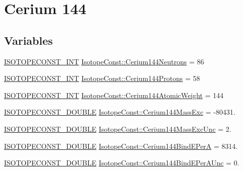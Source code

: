 \hypertarget{group___isotope_const-_cerium-_ce144}{}\section{Cerium 144}
\label{group___isotope_const-_cerium-_ce144}
\subsection*{Variables}
\begin{DoxyCompactItemize}
\item 
\mbox{\hyperlink{group___isotope_const-_macros_ga5f18360b3e99483a35c32d789e62621c}{I\+S\+O\+T\+O\+P\+E\+C\+O\+N\+S\+T\+\_\+\+I\+NT}} \mbox{\hyperlink{group___isotope_const-_cerium-_ce144_ga39587347aeadc54212b3129c64278e13}{Isotope\+Const\+::\+Cerium144\+Neutrons}} = 86
\item 
\mbox{\hyperlink{group___isotope_const-_macros_ga5f18360b3e99483a35c32d789e62621c}{I\+S\+O\+T\+O\+P\+E\+C\+O\+N\+S\+T\+\_\+\+I\+NT}} \mbox{\hyperlink{group___isotope_const-_cerium-_ce144_gac6527e4cbb32809e03fd189a5342e908}{Isotope\+Const\+::\+Cerium144\+Protons}} = 58
\item 
\mbox{\hyperlink{group___isotope_const-_macros_ga5f18360b3e99483a35c32d789e62621c}{I\+S\+O\+T\+O\+P\+E\+C\+O\+N\+S\+T\+\_\+\+I\+NT}} \mbox{\hyperlink{group___isotope_const-_cerium-_ce144_ga6a5dea2a40fff5707820eead37204176}{Isotope\+Const\+::\+Cerium144\+Atomic\+Weight}} = 144
\item 
\mbox{\hyperlink{group___isotope_const-_macros_ga8f45a7272ce02c0b4c65c44636ed719a}{I\+S\+O\+T\+O\+P\+E\+C\+O\+N\+S\+T\+\_\+\+D\+O\+U\+B\+LE}} \mbox{\hyperlink{group___isotope_const-_cerium-_ce144_ga466ea832ccd46d3e3b215d102646067f}{Isotope\+Const\+::\+Cerium144\+Mass\+Exc}} = -\/80431.
\item 
\mbox{\hyperlink{group___isotope_const-_macros_ga8f45a7272ce02c0b4c65c44636ed719a}{I\+S\+O\+T\+O\+P\+E\+C\+O\+N\+S\+T\+\_\+\+D\+O\+U\+B\+LE}} \mbox{\hyperlink{group___isotope_const-_cerium-_ce144_gaf56249cc92a41af14664e1ee1d7fdcff}{Isotope\+Const\+::\+Cerium144\+Mass\+Exc\+Unc}} = 2.
\item 
\mbox{\hyperlink{group___isotope_const-_macros_ga8f45a7272ce02c0b4c65c44636ed719a}{I\+S\+O\+T\+O\+P\+E\+C\+O\+N\+S\+T\+\_\+\+D\+O\+U\+B\+LE}} \mbox{\hyperlink{group___isotope_const-_cerium-_ce144_ga93c3146d0b515a29d34aeea4daa9e00a}{Isotope\+Const\+::\+Cerium144\+Bind\+E\+PerA}} = 8314.
\item 
\mbox{\hyperlink{group___isotope_const-_macros_ga8f45a7272ce02c0b4c65c44636ed719a}{I\+S\+O\+T\+O\+P\+E\+C\+O\+N\+S\+T\+\_\+\+D\+O\+U\+B\+LE}} \mbox{\hyperlink{group___isotope_const-_cerium-_ce144_ga9a4304b011c10706505d54935fe49674}{Isotope\+Const\+::\+Cerium144\+Bind\+E\+Per\+A\+Unc}} = 0.

\end{DoxyCompactItemize}
